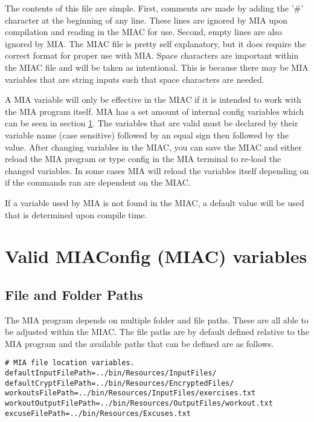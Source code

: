 The contents of this file are simple. First, comments are made by adding the '\#' character at the beginning of any line. These lines are ignored by MIA upon compilation and reading in the MIAC for use. Second, empty lines are also ignored by MIA. The MIAC file is pretty self explanatory, but it does require the correct format for proper use with MIA. Space characters are important within the MIAC file and will be taken as intentional. This is because there may be MIA variables that are string inputs such that space characters are needed. 

A MIA variable will only be effective in the MIAC if it is intended to work with the MIA program itself. MIA has a set amount of internal config variables which can be seen in section \ref{MIAC variables}. The variables that are valid must be declared by their variable name (case sensitive) followed by an equal sign then followed by the value. After changing variables in the MIAC, you can save the MIAC and either reload the MIA program or type config in the MIA terminal to re-load the changed variables. In some cases MIA will reload the variables itself depending on if the commands ran are dependent on the MIAC.

\begin{note}
	If a variable used by MIA is not found in the MIAC, a default value will be used that is determined upon compile time.
\end{note}

\section{Valid MIAConfig (MIAC) variables} \label{MIAC variables} 

\subsection{File and Folder Paths}

The MIA program depends on multiple folder and file paths. These are all able to be adjusted within the MIAC. The file paths are by default defined relative to the MIA program and the available paths that can be defined are as follows.

\begin{lstlisting}
# MIA file location variables.
defaultInputFilePath=../bin/Resources/InputFiles/
defaultCryptFilePath=../bin/Resources/EncryptedFiles/
workoutsFilePath=../bin/Resources/InputFiles/exercises.txt
workoutOutputFilePath=../bin/Resources/OutputFiles/workout.txt
excuseFilePath=../bin/Resources/Excuses.txt
\end{lstlisting}

